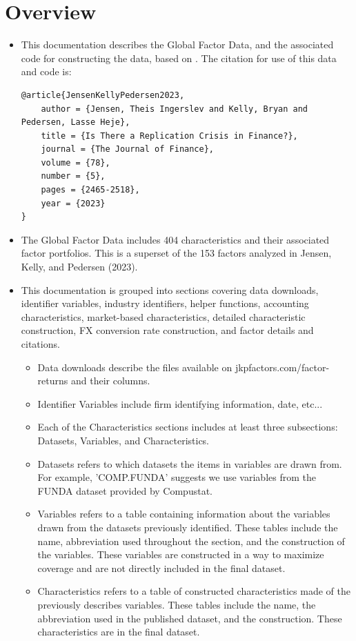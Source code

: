 \documentclass[12pt,title,fleqn]{article}
\begin{document}
\section{Overview}
    \begin{itemize}
    \item This documentation describes the Global Factor Data, and the associated code for constructing the data, based on  \cite{JensenKellyPedersen2023}.  The citation for use of this data and code is:
	\begin{verbatim}
@article{JensenKellyPedersen2023,
	author = {Jensen, Theis Ingerslev and Kelly, Bryan and Pedersen, Lasse Heje},
	title = {Is There a Replication Crisis in Finance?},
	journal = {The Journal of Finance},
	volume = {78},
	number = {5},
	pages = {2465-2518},
	year = {2023}
}	
	\end{verbatim}
	\item The Global Factor Data includes 404 characteristics and their associated factor portfolios.  This is a superset of the 153 factors analyzed in Jensen, Kelly, and Pedersen (2023).
        \item This documentation is grouped into sections covering data downloads, identifier variables, industry identifiers, helper functions, accounting characteristics, market-based characteristics, detailed characteristic construction, FX conversion rate construction, and factor details and citations.
            \begin{itemize}
                \item Data downloads describe the files available on jkpfactors.com/factor-returns and their columns.
                \item Identifier Variables include firm identifying information, date, etc...
                \item Each of the Characteristics sections includes at least three subsections: Datasets, Variables, and Characteristics.
                \item Datasets refers to which datasets the items in variables are drawn from. For example, 'COMP.FUNDA' suggests we use variables from the FUNDA dataset provided by Compustat. 
                \item Variables refers to a table containing information about the variables drawn from the datasets previously identified. These tables include the name, abbreviation used throughout the section, and the construction of the variables. These variables are constructed in a way to maximize coverage and are not directly included in the final dataset. 
                \item Characteristics refers to a table of constructed characteristics made of the previously describes variables. These tables include the name, the abbreviation used in the published dataset, and the construction. These characteristics are in the final dataset. 
            \end{itemize}
    \end{itemize}
\end{document}
